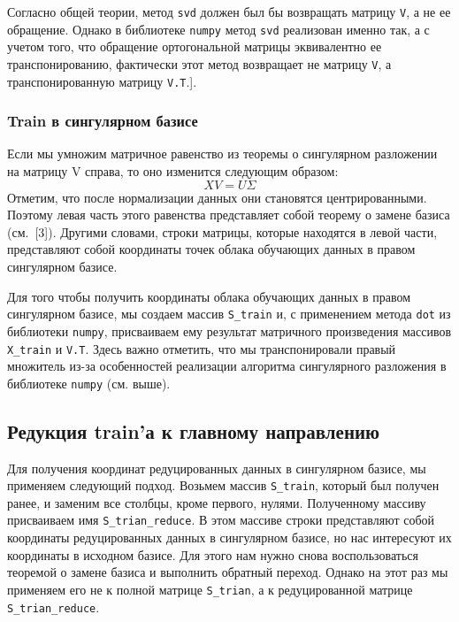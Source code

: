 \documentclass[a4paper,12pt]{article}
\begin{document}
\medskip\noindent
Согласно общей теории, метод \texttt{svd} должен был бы возвращать матрицу \texttt{V}, а не ее обращение. Однако в библиотеке \texttt{numpy} метод \texttt{svd} реализован именно так, а с учетом того, что обращение ортогональной матрицы эквивалентно ее транспонированию, фактически этот метод возвращает не матрицу \texttt{V}, а транспонированную матрицу \texttt{V.T}.].
 

\subsubsection{Train в сингулярном базисе} 

Если мы умножим матричное равенство из теоремы о сингулярном разложении на матрицу V справа, то оно изменится следующим образом:
$$
XV = U\Sigma
$$
Отметим, что после нормализации данных они становятся центрированными. Поэтому левая часть этого равенства представляет собой теорему о замене базиса (см. [3]). Другими словами, строки матрицы, которые находятся в левой части, представляют собой координаты точек облака обучающих данных в правом сингулярном базисе.

Для того чтобы получить координаты облака обучающих данных в правом сингулярном базисе, мы создаем массив \texttt{S\_train} и, с применением метода \texttt{dot} из библиотеки \texttt{numpy}, присваиваем ему результат матричного произведения массивов \texttt{X\_train} и \texttt{V.T}. Здесь важно отметить, что мы транспонировали правый множитель из-за особенностей реализации алгоритма сингулярного разложения в библиотеке \texttt{numpy} (см. выше).

\subsection{Редукция train'а к главному направлению}


Для получения координат редуцированных данных в сингулярном базисе, мы применяем следующий подход. Возьмем массив \texttt{S\_train}, который был получен ранее, и заменим все столбцы, кроме первого, нулями. Полученному массиву присваиваем имя \texttt{S\_trian\_reduce}. В этом массиве строки представляют собой координаты редуцированных данных в сингулярном базисе, но нас интересуют их координаты в исходном базисе. Для этого нам нужно снова воспользоваться теоремой о замене базиса и выполнить обратный переход. Однако на этот раз мы применяем его не к полной матрице \texttt{S\_trian}, а к редуцированной матрице \texttt{S\_trian\_reduce}.
\end{document}
